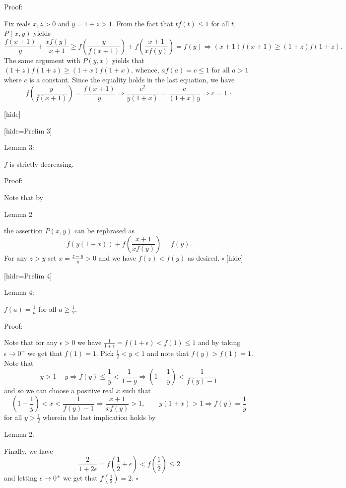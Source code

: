 \begin{solution}
\begin{italicized}Proof:\end{italicized} Fix reals $x,z>0$ and $y=1+z>1$. From the fact that $tf(t) \le 1$ for all $t$, $P(x,y)$ yields $$\frac{f(x+1)}{y}+\frac{xf(y)}{x+1} \ge f\left(\frac{y}{f(x+1)}\right)+f\left(\frac{x+1}{xf(y)}\right)=f(y) \Longrightarrow (x+1)f(x+1) \ge (1+z)f(1+z).$$ The same argument with $P(y,x)$ yields that $(1+z)f(1+z) \ge (1+x)f(1+x)$, whence, $af(a)=c \le 1$ for all $a>1$ where $c$ is a constant. Since the equality holds in the last equation, we have $$f\left(\frac{y}{f(x+1)}\right)=\frac{f(x+1)}{y} \Longrightarrow \frac{c^2}{y(1+x)}=\frac{c}{(1+x)y} \Longrightarrow c=1. \, \square$$

[\/hide]

[hide=Prelim 3] \begin{bolded}Lemma 3:\end{bolded} $f$ is strictly decreasing.

\begin{italicized}Proof: \end{italicized} Note that by \begin{bolded}Lemma 2\end{bolded} the assertion $P(x,y)$ can be rephrased as $$f(y(1+x))+f\left(\frac{x+1}{xf(y)}\right)=f(y).$$ For any $z>y$ set $x=\frac{z-y}{y}>0$ and we have $f(z)<f(y)$ as desired. $\square$
[\/hide]

[hide=Prelim 4] \begin{bolded}Lemma 4:\end{bolded} $f(a)=\frac{1}{a}$ for all $a \ge \frac{1}{2}$.

\begin{italicized}Proof:\end{italicized} Note that for any $\epsilon>0$ we have $\frac{1}{1+\epsilon}=f(1+\epsilon)<f(1) \le 1$ and by taking $\epsilon \rightarrow 0^+$ we get that $f(1)=1$. Pick $\frac{1}{2}<y<1$ and note that $f(y)>f(1)=1$. Note that $$y>1-y \Longrightarrow f(y) \le \frac{1}{y}<\frac{1}{1-y} \Longrightarrow \left(1-\frac{1}{y}\right)<\frac{1}{f(y)-1}$$ and so we can choose a positive real $x$ such that $$\left(1-\frac{1}{y}\right)<x<\frac{1}{f(y)-1} \Longrightarrow \frac{x+1}{xf(y)}>1, \qquad y(1+x)>1 \Longrightarrow f(y)=\frac{1}{y}$$ for all $y>\frac{1}{2}$ wherein the last implication holds by \begin{bolded}Lemma 2.\end{bolded} Finally, we have $$\frac{2}{1+2\epsilon}=f\left(\frac{1}{2}+\epsilon \right)<f\left(\frac{1}{2}\right) \le 2$$ and letting $\epsilon \rightarrow 0^+$ we get that $f\left(\frac{1}{2}\right)=2$. $\square$


\end{solution}

